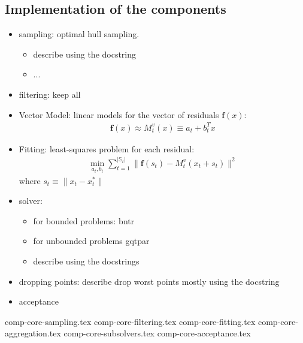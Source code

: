 \subsection{Implementation of the components}
\label{subsec:core-implementation}


\begin{itemize}
    \item sampling: optimal hull sampling.
        \begin{itemize}
            \item describe using the docstring
            \item ...
        \end{itemize}
    \item filtering: keep all
    \item Vector Model:  linear models for the vector of residuals $\mathbf{f}(x)$:
    \begin{align}
        \mathbf{f}(x)\approx M^v_{t}(x) \equiv a_t+b_t^Tx
        \label{eq:model-linear}
    \end{align}
    \item Fitting: least-squares problem for each residual:
    \begin{align}
        \min\limits_{a_{t},b_{t}}\sum\limits_{t=1}^{|\mathbb{S}_t|}\lVert\mathbf{f}(s_t)-M_t^v(x_t+s_t)\rVert^2
        \label{eq:fit-linear}
    \end{align}
    where $s_t\equiv\lVert x_t-x_t^*\rVert$
    \item solver:
        \begin{itemize}
            \item for bounded problems: bntr
            \item for unbounded problems gqtpar
            \item describe using the docstrings
        \end{itemize}
    \item  dropping points: describe drop worst points mostly using the docstring
    \item acceptance
\end{itemize}
{comp-core-sampling.tex}
{comp-core-filtering.tex}
{comp-core-fitting.tex}
{comp-core-aggregation.tex}
{comp-core-subsolvers.tex}
{comp-core-acceptance.tex}
